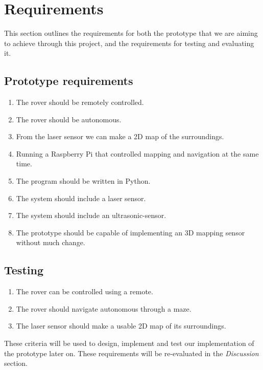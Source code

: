 \section{Requirements}

This section outlines the requirements for both the prototype that we are aiming to achieve through this project, and the requirements for testing and evaluating it.

\subsection{Prototype requirements}

\begin{enumerate}
	
	\item The rover should be remotely controlled.
	\item The rover should be autonomous.
	\item From the laser sensor we can make a 2D map of the surroundings.
	\item Running a Raspberry Pi that controlled mapping and navigation at the same time.
	\item The program should be written in Python.
	\item The system should include a laser sensor.
	\item The system should include an ultrasonic-sensor.
 	\item The prototype should be capable of implementing an 3D mapping sensor without much change.
	
\end{enumerate}

\subsection{Testing}

\begin{enumerate}
	
	\item The rover can be controlled using a remote.
	\item The rover should navigate autonomous through a maze.
	\item The laser sensor should make a usable 2D map of its surroundings.
	
\end{enumerate}

These criteria will be used to design, implement and test our implementation of the prototype later on. These requirements will be re-evaluated in the \textit{Discussion} section.
